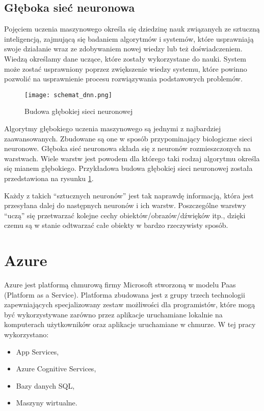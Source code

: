 \subsection{Głęboka sieć neuronowa} \label{dnn}
Pojęciem uczenia maszynowego określa się dziedzinę nauk związanych ze sztuczną inteligencją, zajmującą się badaniem algorytmów i systemów, które usprawniają swoje działanie wraz ze zdobywaniem nowej wiedzy lub też doświadczeniem. Wiedzą określamy dane uczące, które zostały wykorzystane do nauki. System może zostać usprawniony poprzez zwiększenie wiedzy systemu, które powinno pozwolić na usprawnienie procesu rozwiązywania podstawowych problemów.
\begin{figure}[H]
	\centering
	\texttt{[image: schemat\_dnn.png]}
	\caption{Budowa głębokiej sieci neuronowej}
	\label{fig:budowa_dnn}
\end{figure}
Algorytmy głębokiego uczenia maszynowego są jednymi z najbardziej zaawansowanych. Zbudowane są one w sposób przypominający biologiczne sieci neuronowe. Głęboka sieć neuronowa składa się z neuronów rozmieszczonych na warstwach. Wiele warstw jest powodem dla którego taki rodzaj algorytmu określa się mianem głębokiego. Przykładowa budowa głębokiej sieci neuronowej została przedstawiona na rysunku \ref{fig:budowa_dnn}.

Każdy z takich “sztucznych neuronów” jest tak naprawdę informacją, która jest przesyłana dalej do następnych neuronów i ich warstw. Poszczególne warstwy “uczą” się przetwarzać kolejne cechy obiektów/obrazów/dźwięków itp., dzięki czemu są w stanie odtwarzać całe obiekty w bardzo rzeczywisty sposób.

\section{Azure} \label{azure}
Azure jest platformą chmurową firmy Microsoft stworzoną w modelu Paas (Platform as a Service). Platforma zbudowana jest z grupy trzech technologii zapewniających specjalizowany zestaw możliwości dla programistów, które mogą być wykorzystywane zarówno przez aplikacje uruchamiane lokalnie na komputerach użytkowników oraz aplikacje uruchamiane w chmurze. W tej pracy wykorzystano:
\begin{itemize}
    \item App Services,
    \item Azure Cognitive Services,
    \item Bazy danych SQL,
    \item Maszyny wirtualne.
\end{itemize}
